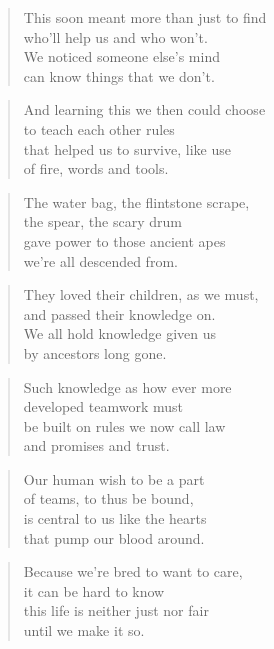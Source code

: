 \documentclass[10pt,a4paper]{article}
\begin{document}
\begin{multicols}{2}
\begin{verse}
This soon meant more than just to find\\
who’ll help us and who won’t.\\
We noticed someone else’s mind\\
can know things that we don’t.
\end{verse}

\begin{verse}
And learning this we then could choose\\
to teach each other rules\\
that helped us to survive, like use\\
of fire, words and tools.
\end{verse}

\begin{verse}
The water bag, the flintstone scrape,\\
the spear, the scary drum\\
gave power to those ancient apes\\
we’re all descended from.
\end{verse}

\begin{verse}
They loved their children, as we must,\\
and passed their knowledge on.\\
We all hold knowledge given us\\
by ancestors long gone.
\end{verse}

\begin{verse}
Such knowledge as how ever more\\
developed teamwork must\\
be built on rules we now call law\\
and promises and trust.
\end{verse}

\begin{verse}
Our human wish to be a part\\
of teams, to thus be bound,\\
is central to us like the hearts\\
that pump our blood around.
\end{verse}

\begin{verse}
Because we’re bred to want to care,\\
it can be hard to know\\
this life is neither just nor fair\\
until we make it so.
\end{verse}


\end{multicols}
\end{document}
